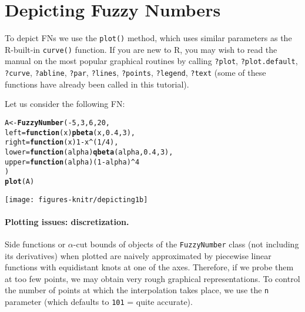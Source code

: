 \documentclass[11pt]{article}\usepackage{graphicx, color}
\makeatletter
\newcommand{\hlfunctioncall}[1]{\textcolor[rgb]{0.501960784313725,0,0.329411764705882}{\textbf{#1}}}%
\newenvironment{kframe}{%
 \def\at@end@of@kframe{}%
 \ifinner\ifhmode%
  \def\at@end@of@kframe{\end{minipage}}%
  \begin{minipage}{\columnwidth}%
 \fi\fi%
 \def\FrameCommand##1{\hskip\@totalleftmargin \hskip-\fboxsep
 \colorbox{shadecolor}{##1}\hskip-\fboxsep
     \hskip-\linewidth \hskip-\@totalleftmargin \hskip\columnwidth}%
 \MakeFramed {\advance\hsize-\width
   \@totalleftmargin\z@ \linewidth\hsize
   \@setminipage}}%
 {\par\unskip\endMakeFramed%
 \at@end@of@kframe}
\newenvironment{knitrout}{}{} %
\newcommand{\lang}[1]{\textsf{#1}\xspace}
\newcommand{\R}{\lang{R}}
\makeatother
\begin{document}




\section{Depicting Fuzzy Numbers}\label{Sec:Depicting}


To depict FNs we use the \texttt{plot()} method,
which uses similar parameters as the \R-built-in
\texttt{curve()} function. If you are new to \R, you may wish
to read the manual on the most popular graphical routines by
calling \texttt{?plot}, \texttt{?plot.default}, \texttt{?curve},
\texttt{?abline}, \texttt{?par}, \texttt{?lines}, \texttt{?points},
\texttt{?legend}, \texttt{?text} (some of these functions have
already been called in this tutorial).

Let us consider the following FN:

\begin{knitrout}\small
{}\color{fgcolor}\begin{kframe}
\begin{alltt}
A <- \hlfunctioncall{FuzzyNumber}(-5, 3, 6, 20,
    left=\hlfunctioncall{function}(x) \hlfunctioncall{pbeta}(x,0.4,3),
   right=\hlfunctioncall{function}(x) 1-x^(1/4),
   lower=\hlfunctioncall{function}(alpha) \hlfunctioncall{qbeta}(alpha,0.4,3),
   upper=\hlfunctioncall{function}(alpha) (1-alpha)^4
)
\hlfunctioncall{plot}(A)
\end{alltt}
\end{kframe}
\end{knitrout}


\begin{center}
\begin{knitrout}\small
{}\color{fgcolor}

{\centering \texttt{[image: figures-knitr/depicting1b]} 

}



\end{knitrout}

\end{center}

\paragraph{Plotting issues: discretization.}
Side functions or $\alpha$-cut bounds of objects of the \texttt{FuzzyNumber}
class (not including its derivatives) when plotted are naively
approximated by piecewise linear functions with equidistant knots
at one of the axes. Therefore, if we probe them
at too few points, we may obtain very rough graphical representations.
To control the number of points at which the interpolation takes place,
we use the \texttt{n} parameter (which defaults to \texttt{101} = quite
accurate).
\end{document}
